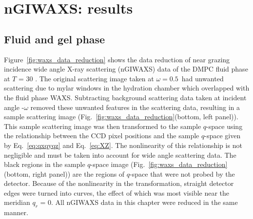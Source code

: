 


\newpage
\section{nGIWAXS: results}\label{sec:nGIWAXS_results}
\subsection{Fluid and gel phase}\label{sec:nGIWAXS_fluid_gel_phase}
Figure~\ref{fig:waxs_data_reduction} shows the data reduction of 
near grazing incidence wide angle X-ray scattering (nGIWAXS) data of
the DMPC fluid phase at $T$ = 30 \textcelsius.
The original scattering image taken at $\omega=0.5$\textdegree\ had unwanted
scattering due to mylar windows in the hydration chamber which
overlapped with the fluid phase WAXS.
Subtracting background scattering data taken at incident angle -$\omega$  
removed these unwanted features in the scattering data, 
resulting in a sample scattering image 
(Fig.~\ref{fig:waxs_data_reduction}(bottom, left panel)).
This sample scattering image was then transformed to the
sample $q$-space using the relationship between the CCD 
pixel positions and the sample $q$-space
given by Eq.~\ref{eq:qxqyqz} and Eq.~\ref{eq:XZ}. The nonlinearity of this
relationship is
not negligible and must be taken into account for wide angle scattering data.
The black regions in the sample $q$-space image
(Fig.~\ref{fig:waxs_data_reduction}(bottom, right panel))
are the regions of $q$-space that
were not probed by the detector. Because of the nonlinearity in the 
transformation, straight detector edges were turned into curves, the effect of
which was most visible near the meridian $q_r$ = 0. All nGIWAXS data
in this chapter were reduced in the same manner.

